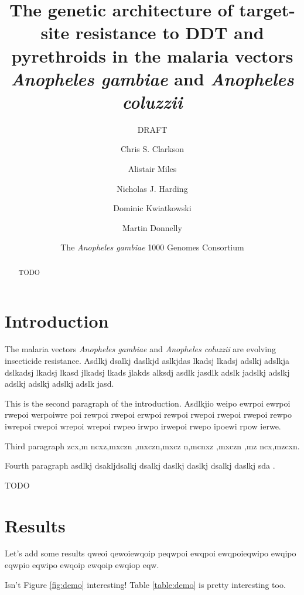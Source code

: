 \documentclass[a4paper,10pt,abstracton]{scrartcl}
\title{
The genetic architecture of target-site resistance to DDT and pyrethroids in the malaria vectors \emph{Anopheles gambiae} and \emph{Anopheles coluzzii}
}
\subtitle{DRAFT}
\author[1]{Chris S. Clarkson}
\author[2,1]{Alistair Miles}
\author[2]{Nicholas J. Harding}
\author[1,2]{Dominic Kwiatkowski}
\author[3,1]{Martin Donnelly}
\author[4]{The \emph{Anopheles gambiae} 1000 Genomes Consortium}
\affil[1]{Sanger @@TODO}
\affil[2]{Oxford @@TODO}
\affil[3]{Liverpool @@TODO}
\affil[4]{MalariaGEN @@TODO}
\begin{document}
\maketitle

\begin{abstract}

TODO

\end{abstract}

\section*{Introduction}

The malaria vectors \emph{Anopheles gambiae} and \emph{Anopheles coluzzii} are evolving insecticide resistance.
%
Asdlkj dsalkj daslkjd aslkjdas lkadsj lkadsj adslkj adslkja dslkadsj lkadsj lkasd jlkadsj lkads jlakds alksdj asdlk jasdlk adslk jadslkj adslkj adslkj adslkj adslkj adslk jasd.

This is the second paragraph of the introduction.
%
Asdlkjio weipo ewrpoi ewrpoi rwepoi werpoiwre poi rewpoi rwepoi erwpoi rewpoi rwepoi rwepoi rwepoi rewpo iwrepoi rwepoi wrepoi wrepoi rwpeo irwpo irwepoi rwepo ipoewi rpow ierwe.

Third paragraph zcx,m ncxz,mxczn ,mxczn,mxcz n,mcnxz ,mxczn ,mz ncx,mzcxn.

Fourth paragraph asdlkj dsakljdsalkj dsalkj daslkj daslkj dsalkj daslkj sda \cite{Garud2015}.

TODO

\section*{Results}

Let's add some results qweoi qewoiewqoip peqwpoi ewqpoi ewqpoieqwipo ewqipo eqwpio eqwipo ewqoip ewqoip ewqiop eqw.

Isn't Figure \ref{fig:demo} interesting! 
%
Table \ref{table:demo} is pretty interesting too.

\begin{landscape}
\begin{table}[h]
  \small
  \centering
  
  \caption{
\textbf{Non-synonymous mutations in the voltage-gated sodium channel gene}. 
%
All mutations are at 5\% frequency or above in one or more of the 9 Ag1000G phase 1 populations, with the exception of \texttt{2,400,071 G>T} which is at 0.4\% frequency in the CM\emph{Ag} population but is included because another mutation (\texttt{2,400,071 G>A}) is found at the same position causing the same amino acid substitution (\texttt{M490I}). 
%
Substitutions marked with an asterisk (*) failed conservative variant filters applied genome-wide in the Ag1000G phase 1 AR3 callset, but appeared sound on manual inspection of read alignments.
}
  \label{table:variants_missense}
\end{table}
\end{landscape}
\end{document}
